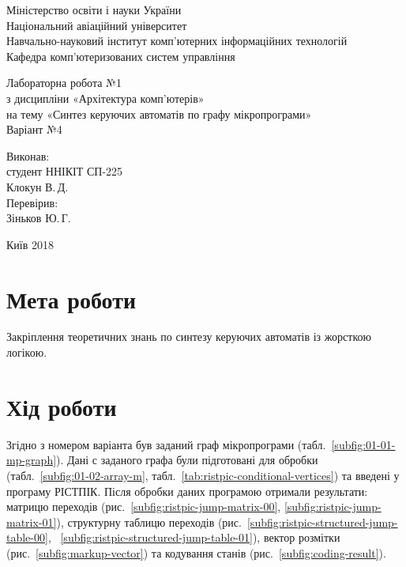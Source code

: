 \documentclass[a4paper,oneside,DIV=12,12pt,headings=normal]{scrartcl}
\newcommand{\allcaps}[1]{{\addfontfeatures{LetterSpace = 3}#1}}
\begin{document}
	\begin{titlepage}
	\centering
		Міністерство освіти і науки України\\
		Національний авіаційний університет\\
		Навчально-науковий інститут комп'ютерних інформаційних технологій\\
		Кафедра комп'ютеризованих систем управління

		\vspace*{\fill}

		Лабораторна робота №1\\
		з дисципліни «Архітектура комп'ютерів»\\
		на тему «Синтез керуючих автоматів по графу мікропрограми»\\
		Варіант №4

		\vspace*{\fill}
		
		\begin{flushright}
			Виконав:\\
			студент ННІКІТ СП-225\\
			Клокун В.\,Д.\\
			Перевірив:\\
			Зіньков Ю.\,Г.
		\end{flushright}

		Київ 2018
    \end{titlepage}
	
	\section{Мета роботи}
		Закріплення теоретичних знань по синтезу керуючих автоматів із жорсткою логікою.
		
	\section{Хід роботи}
		Згідно з номером варіанта був заданий граф мікропрограми (табл.~\ref{subfig:01-01-mp-graph}). Дані с заданого графа були підготовані для обробки (табл.~\ref{subfig:01-02-array-m}, табл.~\ref{tab:ristpic-conditional-vertices}) та введені у програму \allcaps{РІСТПІК}. Після обробки даних програмою отримали результати: матрицю переходів (рис.~\ref{subfig:ristpic-jump-matrix-00}, \ref{subfig:ristpic-jump-matrix-01}), структурну таблицю переходів (рис.~\ref{subfig:ristpic-structured-jump-table-00}, ~\ref{subfig:ristpic-structured-jump-table-01}), вектор розмітки (рис.~\ref{subfig:markup-vector}) та кодування станів (рис.~\ref{subfig:coding-result}).
		
\end{document}
